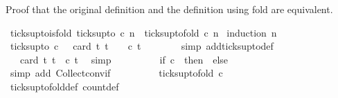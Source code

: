 \begin{isabellebody}
%
\endisatagproof
{\isafoldproof}%
%
\isadelimproof
%
\endisadelimproof
%
\begin{isamarkuptext}%
Proof that the original definition and the definition using fold are equivalent.%
\end{isamarkuptext}\isamarkuptrue%
\isamarkupfalse%
\ ticks{\isacharunderscore}up{\isacharunderscore}to{\isacharunderscore}is{\isacharunderscore}fold{\isacharcolon}\ {\isacartoucheopen}ticks{\isacharunderscore}up{\isacharunderscore}to\ c\ n\ {\isacharequal}\ ticks{\isacharunderscore}up{\isacharunderscore}to{\isacharunderscore}fold\ c\ n{\isacartoucheclose}\isanewline
%
\isadelimproof
%
\endisadelimproof
%
\isatagproof
{}\isamarkupfalse%
\ {\isacharparenleft}induction\ n{\isacharparenright}\isanewline
\ \ \isamarkupfalse%
\ {}\isanewline
\ \ \ \ \isamarkupfalse%
\ {\isacartoucheopen}ticks{\isacharunderscore}up{\isacharunderscore}to\ c\ {}\ {\isacharequal}\ card\ {\isacharbraceleft}t{\isachardot}\ t\ {\isasymle}\ {}\ {\isasymand}\ c\ t{\isacharbraceright}{\isacartoucheclose}\isanewline
\ \ \ \ \ \ \isamarkupfalse%
\ {\isacharparenleft}simp\ add{\isacharcolon}ticks{\isacharunderscore}up{\isacharunderscore}to{\isacharunderscore}def{\isacharparenright}\isanewline
\ \ \ \ \isamarkupfalse%
\ \isamarkupfalse%
\ {\isacartoucheopen}{\isachardot}{\isachardot}{\isachardot}\ {\isacharequal}\ card\ {\isacharbraceleft}t{\isachardot}\ t{\isacharequal}{}\ {\isasymand}\ c\ t{\isacharbraceright}{\isacartoucheclose}\ \isamarkupfalse%
\ simp\isanewline
\ \ \ \ \isamarkupfalse%
\ \isamarkupfalse%
\ {\isacartoucheopen}{\isachardot}{\isachardot}{\isachardot}\ {\isacharequal}\ {\isacharparenleft}if\ c\ {}\ then\ {}\ else\ {}{\isacharparenright}{\isacartoucheclose}\isanewline
\ \ \ \ \ \ \isamarkupfalse%
\ {\isacharparenleft}simp\ add{\isacharcolon}\ Collect{\isacharunderscore}conv{\isacharunderscore}if{\isacharparenright}\isanewline
\ \ \ \ \isamarkupfalse%
\ \isamarkupfalse%
\ {\isacartoucheopen}{\isachardot}{\isachardot}{\isachardot}\ {\isacharequal}\ ticks{\isacharunderscore}up{\isacharunderscore}to{\isacharunderscore}fold\ c\ {}{\isacartoucheclose}\isanewline
\ \ \ \ \ \ \isamarkupfalse%
\ ticks{\isacharunderscore}up{\isacharunderscore}to{\isacharunderscore}fold{\isacharunderscore}def\ count{\isacharunderscore}def\ \isamarkupfalse%

\end{isabellebody}
